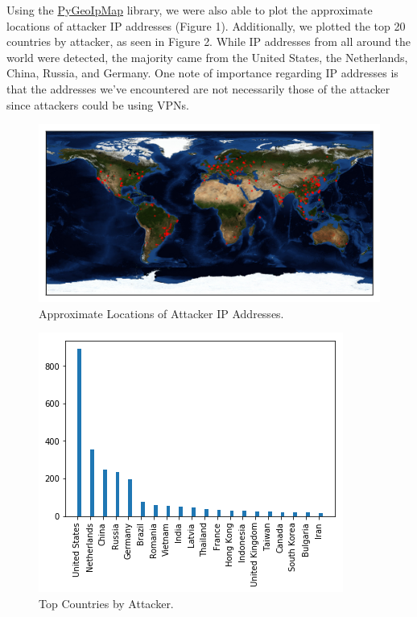 Using the \href{https://github.com/pieqq/PyGeoIpMap}{PyGeoIpMap} library, we were also able to plot the approximate locations of attacker IP addresses (Figure 1). Additionally, we plotted the top 20 countries by attacker, as seen in Figure 2. While IP addresses from all around the world were detected, the majority came from the United States, the Netherlands, China, Russia, and Germany. One note of importance regarding IP addresses is that the addresses we've encountered are not necessarily those of the attacker since attackers could be using VPNs.

\begin{figure}[H]
	\includegraphics[width=\linewidth]{output.png}
	\caption{Approximate Locations of Attacker IP Addresses.}
	\label{fig:map}
\end{figure}


\begin{figure}[H]
	\includegraphics[width=\linewidth]{countries.png}
	\caption{Top Countries by Attacker.}
	\label{fig:top-countries}
\end{figure}
